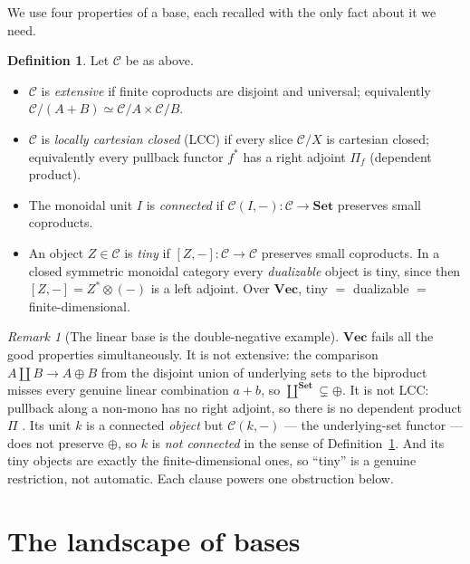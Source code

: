 \documentclass[11pt]{amsart}
\theoremstyle{plain}
\theoremstyle{definition}
\newtheorem{definition}[theorem]{Definition}
\theoremstyle{remark}
\newtheorem{remark}[theorem]{Remark}
\newcommand{\C}{\mathcal{C}}
\newcommand{\Set}{\mathbf{Set}}
\newcommand{\Vect}{\mathbf{Vec}}
\newcommand{\ihom}[2]{[#1,#2]}
\begin{document}
We use four properties of a base, each recalled with the only fact about it we need.

\begin{definition}\label{def:props}
Let $\C$ be as above.
\begin{itemize}
\item $\C$ is \emph{extensive} if finite coproducts are disjoint and universal; equivalently
$\C/(A+B)\simeq\C/A\times\C/B$.
\item $\C$ is \emph{locally cartesian closed} (LCC) if every slice $\C/X$ is cartesian closed;
equivalently every pullback functor $f^*$ has a right adjoint $\Pi_f$ (dependent product).
\item The monoidal unit $I$ is \emph{connected} if $\C(I,-)\colon\C\to\Set$ preserves small
coproducts.
\item An object $Z\in\C$ is \emph{tiny} if $\ihom{Z}{-}\colon\C\to\C$ preserves small coproducts.
In a closed symmetric monoidal category every \emph{dualizable} object is tiny, since then
$\ihom{Z}{-}=Z^*\otimes(-)$ is a left adjoint. Over $\Vect$, tiny $=$ dualizable $=$
finite-dimensional.
\end{itemize}
\end{definition}

\begin{remark}[The linear base is the double-negative example]\label{rem:vecbad}
$\Vect$ fails all the good properties simultaneously. It is not extensive: the comparison
$A\amalg B\to A\oplus B$ from the disjoint union of underlying sets to the biproduct misses every
genuine linear combination $a+b$, so $\coprod^{\Set}\subsetneq\oplus$. It is not LCC: pullback along
a non-mono has no right adjoint, so there is no dependent product $\Pi$ \cite{GambinoKock}. Its unit
$k$ is a connected \emph{object} but $\C(k,-)$ --- the underlying-set functor --- does not preserve
$\oplus$, so $k$ is \emph{not connected} in the sense of Definition~\ref{def:props}. And its tiny
objects are exactly the finite-dimensional ones, so ``tiny'' is a genuine restriction, not
automatic. Each clause powers one obstruction below.
\end{remark}

\section{The landscape of bases}\label{sec:landscape}
\end{document}
